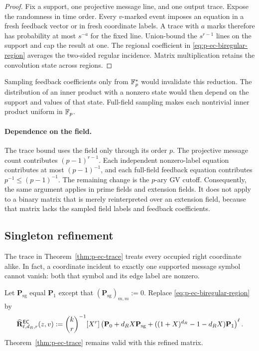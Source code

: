 \begin{proof}
Fix a support, one projective message line, and one output trace.  Expose the
randomness in time order.  Every $v$-marked event imposes an equation in a
fresh feedback vector or in fresh coordinate labels.  A trace with $a$ marks
therefore has probability at most $s^{-a}$ for the fixed line.  Union-bound
the $s^{r-1}$ lines on the support and cap the result at one.  The regional
coefficient in \eqref{eq:p-ec-biregular-region} averages the two-sided regular
incidence.  Matrix multiplication retains the convolution state across
regions.
\end{proof}

Sampling feedback coefficients only from $\mathbb F_p^*$ would invalidate this
reduction.  The distribution of an inner product with a nonzero state would
then depend on the support and values of that state.  Full-field sampling
makes each nontrivial inner product uniform in $\mathbb F_p$.

\paragraph{Dependence on the field.}
The trace bound uses the field only through its order $p$.  The projective
message count contributes $(p-1)^{r-1}$.  Each independent nonzero-label
equation contributes at most $(p-1)^{-1}$, and each full-field feedback
equation contributes $p^{-1}\leq(p-1)^{-1}$.  The remaining change is the
$p$-ary GV cutoff.  Consequently, the same argument applies in prime fields
and extension fields.  It does not apply to a binary matrix that is merely
reinterpreted over an extension field, because that matrix lacks the sampled
field labels and feedback coefficients.

\subsection{Singleton refinement}

The trace in Theorem~\ref{thm:p-ec-trace} treats every occupied right
coordinate alike.  In fact, a coordinate incident to exactly one supported
message symbol cannot vanish: both that symbol and its edge label are
nonzero.

Let $\mathbf P_{\mathrm{sg}}$ equal $\mathbf P_1$ except that
$(\mathbf P_{\mathrm{sg}})_{m,m}:=0$.  Replace
\eqref{eq:p-ec-biregular-region} by
\begin{equation}
 \widehat{\mathbf R}^{\mathsf{EC}}_{\ell,d_R,r}(z,v):=
 \binom{k}{r}^{-1}[X^r]
 \left(
 \mathbf P_0+d_RX\mathbf P_{\mathrm{sg}}+
 ((1+X)^{d_R}-1-d_RX)\mathbf P_1
 \right)^\ell.
 \label{eq:p-ec-singleton-region}
\end{equation}
Theorem~\ref{thm:p-ec-trace} remains valid with this refined matrix.

